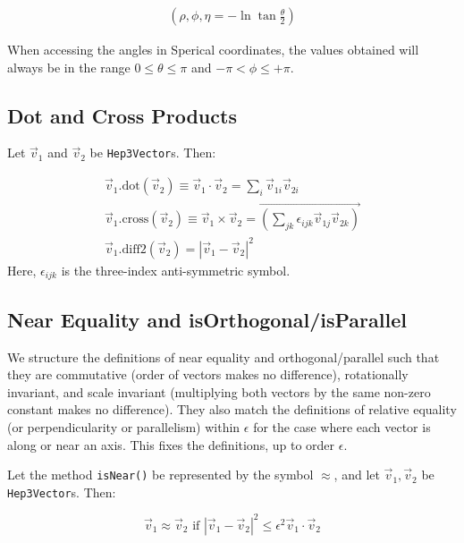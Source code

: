 \documentclass[twoside,12pt]{article}
\def \SV {{\tt Hep3Vector}}
\begin{document}
\begin{eqnarray}
  \left( \rho, \phi, \eta = - \ln { \tan { \frac {\theta}{2} } } \right)
  \label{eq:spherical}
\end{eqnarray}

When accessing the angles in Sperical coordinates, the values obtained will
always be in the range  $0 \leq \theta \leq \pi$ and $-\pi < \phi \leq +\pi$. 


\subsection {Dot and Cross Products}

\noindent
Let $\vec{v}_{1}$ and $\vec{v}_{2}$ be \SV s.  Then:

\begin{eqnarray}
  \vec{v}_{1}.\mbox{dot} (\vec{v}_{2}) \equiv
    \vec{v}_{1} \cdot \vec{v}_{2} = \sum_{i} \vec{v}_{1i} \vec{v}_{2i}
    \label{eq:dot} \\
  \vec{v}_{1}.\mbox{cross} (\vec{v}_{2}) \equiv
    \vec{v}_{1} \times \vec{v}_{2} = \stackrel{\longrightarrow} 
	{ {\textstyle \left( 
		\sum_{jk} \epsilon_{ijk} \vec{v}_{1j} \vec{v}_{2k} \right) } }
    \label{eq:cross} \\
  \vec{v}_{1}.\mbox{diff2} (\vec{v}_{2}) =
    \left| \vec{v}_{1} - \vec{v}_{2} \right| ^ 2 \label{eq:diff2}
\end{eqnarray}
\noindent
Here, $\epsilon_{ijk}$ is the three-index anti-symmetric symbol.


\subsection {Near Equality and isOrthogonal/isParallel}

\noindent
We structure the definitions of near equality and orthogonal/parallel such that
they are commutative (order of vectors makes no difference), rotationally
invariant, and scale invariant (multiplying both vectors by the same non-zero
constant makes no difference).  They also match the definitions of relative
equality (or perpendicularity or parallelism) within $\epsilon$ for the case
where each vector is along or near an axis.  This fixes the definitions, up to
order $\epsilon$.

\noindent
Let the method {\tt isNear()} be represented by the symbol $\approx$,
and let $\vec{v}_{1}, \vec{v}_{2}$ be \SV s.
Then:

\begin{equation}
\label{vecisnear}
\vec{v}_{1} \approx \vec{v}_{2} \mbox{ if }
  \left| \vec{v}_{1} - \vec{v}_{2} \right| ^ 2
  \leq \epsilon^2 \vec{v}_{1} \cdot \vec{v}_{2}
  \label{eq:isNear}
\end{equation}
\end{document}
